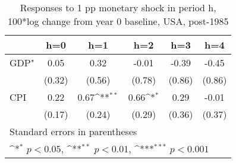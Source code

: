 \begin{table}[htbp]\centering
\def\sym#1{\ifmmode^{#1}\else\(^{#1}\)\fi}
\caption{Responses to 1 pp monetary shock in period h, 100*log change from year 0 baseline, USA, post-1985}
\begin{tabular}{l*{5}{c}}
\hline\hline
            &\multicolumn{1}{c}{h=0}&\multicolumn{1}{c}{h=1}&\multicolumn{1}{c}{h=2}&\multicolumn{1}{c}{h=3}&\multicolumn{1}{c}{h=4}\\
\hline
GDP"        &        0.05         &        0.32         &       -0.01         &       -0.39         &       -0.45         \\
            &      (0.32)         &      (0.56)         &      (0.78)         &      (0.86)         &      (0.86)         \\
[1em]
CPI         &        0.22         &        0.67\sym{**} &        0.66\sym{*}  &        0.29         &       -0.01         \\
            &      (0.17)         &      (0.24)         &      (0.29)         &      (0.36)         &      (0.37)         \\
\hline\hline
\multicolumn{6}{l}{\footnotesize Standard errors in parentheses}\\
\multicolumn{6}{l}{\footnotesize \sym{*} \(p<0.05\), \sym{**} \(p<0.01\), \sym{***} \(p<0.001\)}\\
\end{tabular}
\end{table}
